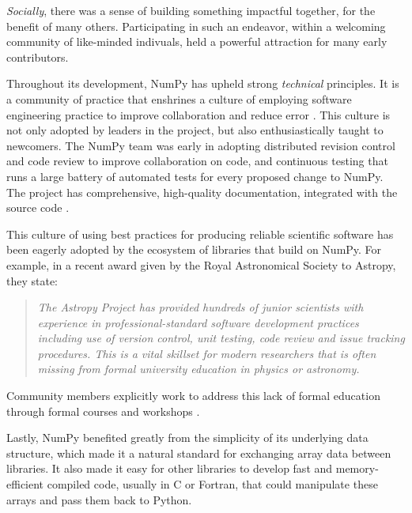 \emph{Socially}, there was a sense of building something
impactful together, for the benefit of many others.  Participating in
such an endeavor, within a welcoming community of like-minded
indivuals, held a powerful attraction for many early contributors.

Throughout its development, NumPy has upheld strong \emph{technical}
principles.  It is a community of practice that enshrines a culture of
employing software engineering practice to improve collaboration and
reduce error \cite{millman2014developing}.  This culture is not only
adopted by leaders in the project, but also enthusiastically taught to
newcomers. The NumPy team was early in adopting distributed revision
control and code review to improve collaboration on code, and
continuous testing that runs a large battery of automated tests for
every proposed change to NumPy.  The project has comprehensive,
high-quality documentation, integrated with the source
code \cite{vanderwalt2008scipy,harrington2008scipy,harrington2009scipy}.


This culture of using best practices for producing reliable scientific software
has been eagerly adopted by the ecosystem of libraries that build on NumPy.
For example, in a recent award given by the Royal Astronomical Society to
Astropy, they state:
\begin{quotation}
\noindent\emph{The Astropy Project has provided hundreds of junior scientists
with experience in professional-standard software development practices
including use of version control, unit testing, code review and issue tracking
procedures. This is a vital skillset for modern researchers that is often
missing from formal university education in physics or astronomy.}
\end{quotation}
Community members explicitly work to address this lack of formal education
through formal courses and workshops
\cite{wilson-software-carpentry,hannay-scientific-software-survey,millman2018teaching}.

Lastly, NumPy benefited greatly from the simplicity of its underlying data
structure, which made it a natural standard for exchanging array data between
libraries.  It also made it easy for other libraries to develop fast and
memory-efficient compiled code, usually in C or Fortran, that could manipulate
these arrays and pass them back to Python.

